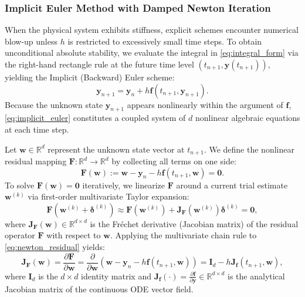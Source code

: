 \documentclass[11pt,a4paper]{article}
\theoremstyle{definition}
\theoremstyle{remark}
\begin{document}
\subsubsection{Implicit Euler Method with Damped Newton Iteration}
When the physical system exhibits stiffness, explicit schemes encounter numerical blow-up unless $h$ is restricted to excessively small time steps. To obtain unconditional absolute stability, we evaluate the integral in \eqref{eq:integral_form} via the right-hand rectangle rule at the future time level $(t_{n+1}, \mathbf{y}(t_{n+1}))$, yielding the Implicit (Backward) Euler scheme:
\begin{equation}
\label{eq:implicit_euler}
\mathbf{y}_{n+1} = \mathbf{y}_n + h \mathbf{f}(t_{n+1}, \mathbf{y}_{n+1}).
\end{equation}
Because the unknown state $\mathbf{y}_{n+1}$ appears nonlinearly within the argument of $\mathbf{f}$, \eqref{eq:implicit_euler} constitutes a coupled system of $d$ nonlinear algebraic equations at each time step. 

Let $\mathbf{w} \in \mathbb{R}^d$ represent the unknown state vector at $t_{n+1}$. We define the nonlinear residual mapping $\mathbf{F}: \mathbb{R}^d \to \mathbb{R}^d$ by collecting all terms on one side:
\begin{equation}
\label{eq:newton_residual}
\mathbf{F}(\mathbf{w}) := \mathbf{w} - \mathbf{y}_n - h \mathbf{f}(t_{n+1}, \mathbf{w}) = \mathbf{0}.
\end{equation}
To solve $\mathbf{F}(\mathbf{w}) = \mathbf{0}$ iteratively, we linearize $\mathbf{F}$ around a current trial estimate $\mathbf{w}^{(k)}$ via first-order multivariate Taylor expansion:
\begin{equation}
\label{eq:taylor_residual}
\mathbf{F}\left(\mathbf{w}^{(k)} + \boldsymbol{\delta}^{(k)}\right) \approx \mathbf{F}\left(\mathbf{w}^{(k)}\right) + \mathbf{J}_{\mathbf{F}}\left(\mathbf{w}^{(k)}\right) \boldsymbol{\delta}^{(k)} = \mathbf{0},
\end{equation}
where $\mathbf{J}_{\mathbf{F}}(\mathbf{w}) \in \mathbb{R}^{d \times d}$ is the Fr\'echet derivative (Jacobian matrix) of the residual operator $\mathbf{F}$ with respect to $\mathbf{w}$. Applying the multivariate chain rule to \eqref{eq:newton_residual} yields:
\begin{equation}
\label{eq:residual_jacobian}
\mathbf{J}_{\mathbf{F}}(\mathbf{w}) = \frac{\partial \mathbf{F}}{\partial \mathbf{w}} = \frac{\partial}{\partial \mathbf{w}} \left(\mathbf{w} - \mathbf{y}_n - h \mathbf{f}(t_{n+1}, \mathbf{w})\right) = \mathbf{I}_d - h \mathbf{J}_{\mathbf{f}}(t_{n+1}, \mathbf{w}),
\end{equation}
where $\mathbf{I}_d$ is the $d \times d$ identity matrix and $\mathbf{J}_{\mathbf{f}}(\cdot) = \frac{\partial \mathbf{f}}{\partial \mathbf{y}} \in \mathbb{R}^{d \times d}$ is the analytical Jacobian matrix of the continuous ODE vector field.
\end{document}
